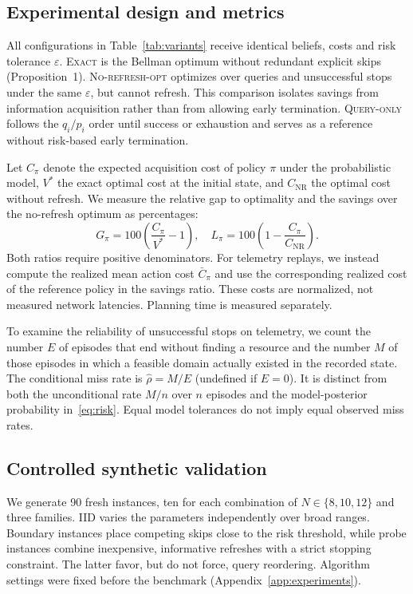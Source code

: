 \documentclass[conference]{IEEEtran}
\begin{document}
\subsection{Experimental design and metrics}
All configurations in Table~\ref{tab:variants} receive identical beliefs, costs and risk tolerance $\varepsilon$. \textsc{Exact} is the Bellman optimum without redundant explicit skips (Proposition~1). \textsc{No-refresh-opt} optimizes over queries and unsuccessful stops under the same $\varepsilon$, but cannot refresh. This comparison isolates savings from information acquisition rather than from allowing early termination. \textsc{Query-only} follows the $q_i/p_i$ order until success or exhaustion and serves as a reference without risk-based early termination.

Let $C_\pi$ denote the expected acquisition cost of policy $\pi$ under the probabilistic model, $V^*$ the exact optimal cost at the initial state, and $C_{\mathrm{NR}}$ the optimal cost without refresh. We measure the relative gap to optimality and the savings over the no-refresh optimum as percentages:
\begin{equation}
 G_\pi=100\left(\frac{C_\pi}{V^*}-1\right),\quad
 L_\pi=100\left(1-\frac{C_\pi}{C_{\mathrm{NR}}}\right).
 \label{eq:metrics}
\end{equation}
Both ratios require positive denominators. For telemetry replays, we instead compute the realized mean action cost $\bar C_\pi$ and use the corresponding realized cost of the reference policy in the savings ratio. These costs are normalized, not measured network latencies. Planning time is measured separately.

To examine the reliability of unsuccessful stops on telemetry, we count the number $E$ of episodes that end without finding a resource and the number $M$ of those episodes in which a feasible domain actually existed in the recorded state. The conditional miss rate is $\widehat\rho=M/E$ (undefined if $E=0$). It is distinct from both the unconditional rate $M/n$ over $n$ episodes and the model-posterior probability in~\eqref{eq:risk}. Equal model tolerances do not imply equal observed miss rates.

\subsection{Controlled synthetic validation}
We generate 90 fresh instances, ten for each combination of $N\in\{8,10,12\}$ and three families. IID varies the parameters independently over broad ranges. Boundary instances place competing skips close to the risk threshold, while probe instances combine inexpensive, informative refreshes with a strict stopping constraint. The latter favor, but do not force, query reordering. Algorithm settings were fixed before the benchmark (Appendix~\ref{app:experiments}).
\end{document}
